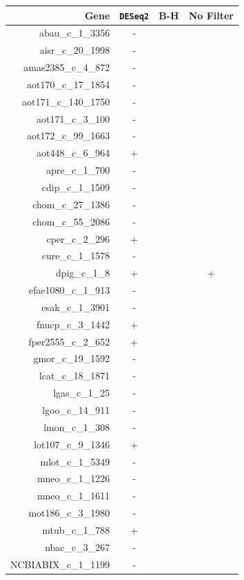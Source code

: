 \documentclass{article}
\begin{document}
\begin{table}[h]
\begin{center}
\begin{tabular}{r|ccc}
Gene &  \texttt{DESeq2} & B-H & No Filter\\
\hline
abau\_c\_1\_3356 & - &  &   \\
aisr\_c\_20\_1998 & -  &  &   \\
   amas2385\_c\_4\_872 & - &  &   \\
   aot170\_c\_17\_1854 & - &  &   \\
  aot171\_c\_140\_1750 & - &  &   \\
     aot171\_c\_3\_100 & - &  &   \\
   aot172\_c\_99\_1663 & - &  &   \\
   aot448\_c\_6\_964 & +  &  &   \\
  apre\_c\_1\_700 & - &  &   \\
 cdip\_c\_1\_1509 & - &  &   \\
chom\_c\_27\_1386 & - &  &   \\
chom\_c\_55\_2086 & - &  &   \\
  cper\_c\_2\_296   & +  &  &   \\
 cure\_c\_1\_1578 & - &  &   \\
    dpig\_c\_1\_8   & +  &  & +  \\
     efae1080\_c\_1\_913 & - &  &   \\
     esak\_c\_1\_3901 & - &  &   \\
    fnucp\_c\_3\_1442  & + &  &   \\
  fper2555\_c\_2\_652   & +  &  &   \\
   gmor\_c\_19\_1592 & - &  &   \\
 lcat\_c\_18\_1871 & - &  &   \\
    lgas\_c\_1\_25 & - &  &   \\
  lgoo\_c\_14\_911 & - &  &   \\
   lmon\_c\_1\_308 & - &  &   \\
lot107\_c\_9\_1346  &+ &  &   \\ 
  mlot\_c\_1\_5349 & - &  &   \\
  mneo\_c\_1\_1226 & - &  &   \\
  mneo\_c\_1\_1611 & - &  &   \\
  mot186\_c\_3\_1980 & - &  &   \\
      mtub\_c\_1\_788   &+ &  &   \\
      nbac\_c\_3\_267 & - &  &   \\
 NCBIABIX\_c\_1\_1199 & - &  &   \\

\end{tabular}
\end{center}
\end{table}
\end{document}
